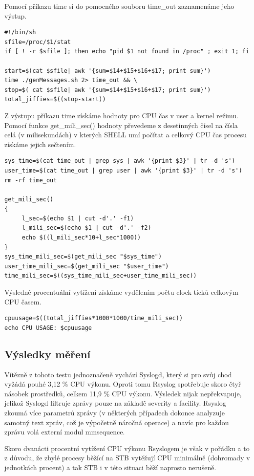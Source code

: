 \documentclass[thesis=B,czech]{FITthesis}[2012/06/26]
\begin{document}
Pomocí příkazu time si do pomocného souboru time\_out zaznamenáme jeho výstup.
\begin{lstlisting}[style=AshSimpleStyle]
#!/bin/sh
sfile=/proc/$1/stat
if [ ! -r $sfile ]; then echo "pid $1 not found in /proc" ; exit 1; fi

start=$(cat $sfile| awk '{sum=$14+$15+$16+$17; print sum}')
time ./genMessages.sh 2> time_out && \
stop=$( cat $sfile| awk '{sum=$14+$15+$16+$17; print sum}')
total_jiffies=$((stop-start))
\end{lstlisting}

Z výstupu příkazu time získáme hodnoty pro CPU čas v user a kernel režimu. Pomocí funkce get\_mili\_sec() hodnoty převedeme z desetinných čísel na čísla celá (v  milisekundách) v kterých SHELL umí počítat a celkový CPU čas procesu získáme jejich sečtením.
\begin{lstlisting}[style=AshSimpleStyle]
sys_time=$(cat time_out | grep sys | awk '{print $3}' | tr -d 's')
user_time=$(cat time_out | grep user | awk '{print $3}' | tr -d 's')
rm -rf time_out

get_mili_sec()
{
	 l_sec=$(echo $1 | cut -d'.' -f1)
	 l_mili_sec=$(echo $1 | cut -d'.' -f2)
	 echo $((l_mili_sec*10+l_sec*1000))
}
sys_time_mili_sec=$(get_mili_sec "$sys_time")
user_time_mili_sec=$(get_mili_sec "$user_time")
time_mili_sec=$((sys_time_mili_sec+user_time_mili_sec))
\end{lstlisting}
Výsledné procentuální vytížení získáme vydělením počtu clock ticků celkovým CPU časem. 
\begin{lstlisting}[style=AshSimpleStyle]
cpuusage=$((total_jiffies*1000*1000/time_mili_sec))
echo CPU USAGE: $cpuusage 
\end{lstlisting}

\subsection*{Výsledky měření}
Vítězně z tohoto testu jednoznačeně vychází Syslogd, který si pro svůj chod vyžádá pouhé 3,12 \% CPU výkonu. Oproti tomu Rsyslog spotřebuje skoro čtyř násobek prostředků, celkem 11,9 \% CPU výkonu.
Výsledek nijak nepřekvapuje, jelikož Syslogd filtruje zprávy pouze na základě severity a facility. Rsyslog zkoumá více parametrů zprávy (v některých případech dokonce analyzuje samotný text zpráv, což je výpočetně náročná operace) a navíc pro každou zprávu volá externí modul mmsequence.

Skoro dvanácti procentní vytížení CPU výkonu Rsyslogem je však v pořádku a to z důvodu, že zbylé procesy běžící na STB vytěžují CPU minimálně (dohromady v jednotkách  procent) a tak STB i v této situaci běží naprosto nerušeně.
\end{document}
